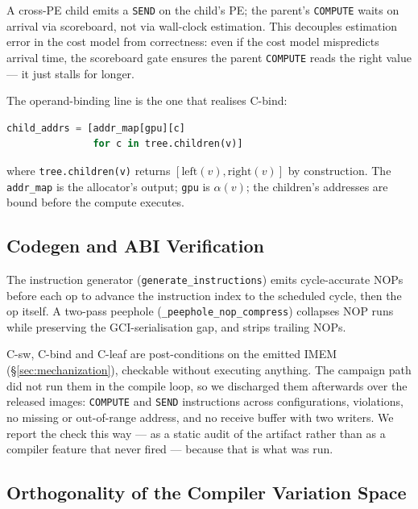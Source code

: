 \documentclass[journal,10pt]{IEEEtran}
\theoremstyle{plain}
\theoremstyle{definition}
\theoremstyle{remark}
\newcommand{\sv}[1]{\texttt{#1}}
\newcommand{\asgn}{\ensuremath{\alpha}}
\begin{document}
A cross-PE child emits a \texttt{SEND} on the child's PE; the parent's
\texttt{COMPUTE} waits on arrival via scoreboard, not via wall-clock
estimation. This decouples estimation error in the cost model from
correctness: even if the cost model mispredicts arrival time, the
scoreboard gate ensures the parent \texttt{COMPUTE} reads the right
value --- it just stalls for longer.

The operand-binding line is the one that realises \textsf{C-bind}:
\begin{lstlisting}[language=Python]
child_addrs = [addr_map[gpu][c]
               for c in tree.children(v)]
\end{lstlisting}
where \sv{tree.children(v)} returns $[\mathrm{left}(v),
\mathrm{right}(v)]$ by construction. The \sv{addr\_map} is the
allocator's output; \sv{gpu} is $\asgn(v)$; the children's addresses
are bound before the compute executes.

\subsection{Codegen and ABI Verification}\label{sec:compiler-codegen}

The instruction generator (\sv{generate\_instructions}) emits
cycle-accurate NOPs before each op to advance the instruction index to
the scheduled cycle, then the op itself. A two-pass peephole
(\sv{\_peephole\_nop\_compress}) collapses NOP runs while preserving
the GCI-serialisation gap, and strips trailing NOPs.

\textsf{C-sw}, \textsf{C-bind} and \textsf{C-leaf} are post-conditions on
the emitted IMEM (\S\ref{sec:mechanization}), checkable without executing
anything. The campaign path did not run them in the compile loop, so we
discharged them afterwards over the released images: \BindComputes{}
\texttt{COMPUTE} and \BindSends{} \texttt{SEND} instructions across
\BindConfigs{} configurations, \BindViolations{} violations, no missing or
out-of-range address, and no receive buffer with two writers. We report the
check this way --- as a static audit of the artifact rather than as a
compiler feature that never fired --- because that is what was run.

\subsection{Orthogonality of the Compiler Variation Space}\label{sec:compiler-orth}
\end{document}
